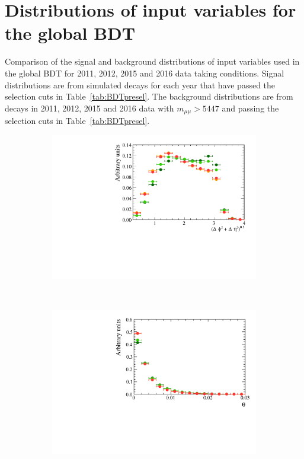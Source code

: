 \chapter{Distributions of input variables for the global BDT}
\label{sec:appendix1}
Comparison of the signal and background distributions of input variables used in the global BDT for 2011, 2012, 2015 and 2016 data taking conditions. Signal distributions are from simulated \bsmumu decays for each year that have passed the selection cuts in Table~\ref{tab:BDTpresel}. The background distributions are from \bbbarmumux decays in 2011, 2012, 2015 and 2016 data with $m_{\mu \mu} > 5447$ \mevcc and passing the selection cuts in Table~\ref{tab:BDTpresel}.
\begin{figure}
    \centering
    \begin{subfigure}[b]{0.48\textwidth}
        \includegraphics[width=\textwidth]{./Figs/Appendix1/signal_deltaR.pdf}
    \end{subfigure}
    ~ %
    \begin{subfigure}[b]{0.48\textwidth}
       \includegraphics[width=\textwidth]{./Figs/Appendix1/signal_DIRA.pdf}
    \end{subfigure}




\end{figure}
